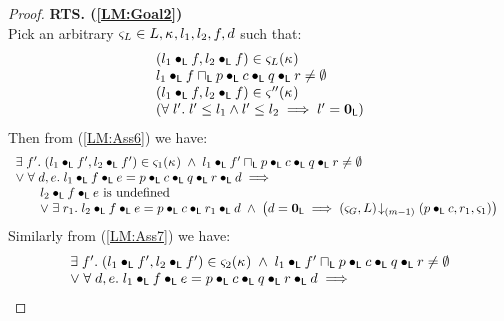 \begin{lemma}[]
\begin{proof}
\noindent\textbf{RTS. (\ref{LM:Goal2})}\\
Pick an arbitrary $\varsigma_{L} \in L, \kappa_{}, l_1, l_2, f, d$ such that:
%
\begin{align}
	\begin{array}{l}
		(l_1 \bullet_{\textsf{L}} f, l_2 \bullet_{\textsf{L}} f) \in \varsigma_{L}(\kappa_{})\\
		l_1 \bullet_{\textsf{L}} f \sqcap_{\textsf{L}} p \bullet_{\textsf{L}} c \bullet_{\textsf{L}} q \bullet_{\textsf{L}} r \not= \emptyset\\
  	(l_1 \bullet_{\textsf{L}} f, l_2 \bullet_{\textsf{L}} f) \in \varsigma_{}''(\kappa_{}) \\
  	\left(\forall\; l'.\; l' \leq l_1 \land l' \leq l_2 \implies l' = \mathbf{0}_{\textsf{L}}\right)\\
	\end{array} \label{LAM: Ass1}
\end{align} 
%
Then from (\ref{LM:Ass6}) we have:
%
\begin{align}
	\begin{array}{l}
		\exists\; f'.\; (l_1 \bullet_{\textsf{L}} f', l_2 \bullet_{\textsf{L}} f') \in \varsigma_{1}(\kappa_{}) \;\land\; l_1 \bullet_{\textsf{L}} f' \sqcap_{\textsf{L}} p \bullet_{\textsf{L}} c \bullet_{\textsf{L}} q \bullet_{\textsf{L}} r \not= \emptyset\\
		\lor\;\forall\; d, e.\;  l_1 \bullet_{\textsf{L}} f \bullet_{\textsf{L}} e = p \bullet_{\textsf{L}} c \bullet_{\textsf{L}} q \bullet_{\textsf{L}} r \bullet_{\textsf{L}} d \implies\\
		\hspace*{0.5cm}
		\begin{array}{l l}
			l_2 \bullet_{\textsf{L}} f \bullet_{\textsf{L}} e \text{ is undefined}\\
			\lor\; \exists\; r_1.\; l_2 \bullet_{\textsf{L}} f \bullet_{\textsf{L}} e = p \bullet_{\textsf{L}} c \bullet_{\textsf{L}} r_1 \bullet_{\textsf{L}} d \;\land\;\left( d = \mathbf{0}_{\textsf{L}} \implies  \left(\varsigma_{G}, L\right) \!\downarrow_{(m-1)} \left(p \bullet_{\textsf{L}} c, r_1, \varsigma_{1}\right)\right)
		\end{array}
	\end{array} \label{LM:Ass29}
\end{align}
%
Similarly from (\ref{LM:Ass7}) we have:
%
\begin{align}
	\begin{array}{l}
	\exists\; f'.\; (l_1 \bullet_{\textsf{L}} f', l_2 \bullet_{\textsf{L}} f') \in \varsigma_{2}(\kappa_{}) \;\land\; l_1 \bullet_{\textsf{L}} f' \sqcap_{\textsf{L}} p \bullet_{\textsf{L}} c \bullet_{\textsf{L}} q \bullet_{\textsf{L}} r \not= \emptyset\\
	\lor\;\forall\; d, e.\;  l_1 \bullet_{\textsf{L}} f \bullet_{\textsf{L}} e = p \bullet_{\textsf{L}} c \bullet_{\textsf{L}} q \bullet_{\textsf{L}} r \bullet_{\textsf{L}} d \implies\\

\end{array}
\end{align}
\end{proof}
\end{lemma}
